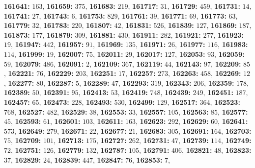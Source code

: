 \textsf{\bfseries 161641:} $163$, \textsf{\bfseries 161659:} $375$, \textsf{\bfseries 161683:} $219$, \textsf{\bfseries 161717:} $31$, \textsf{\bfseries 161729:} $459$, \textsf{\bfseries 161731:} $14$, \textsf{\bfseries 161741:} $27$, \textsf{\bfseries 161743:} $6$, \textsf{\bfseries 161753:} $829$, \textsf{\bfseries 161761:} $39$, \textsf{\bfseries 161771:} $69$, \textsf{\bfseries 161773:} $63$, \textsf{\bfseries 161779:} $32$, \textsf{\bfseries 161783:} $220$, \textsf{\bfseries 161807:} $42$, \textsf{\bfseries 161831:} $526$, \textsf{\bfseries 161839:} $127$, \textsf{\bfseries 161869:} $187$, \textsf{\bfseries 161873:} $177$, \textsf{\bfseries 161879:} $309$, \textsf{\bfseries 161881:} $430$, \textsf{\bfseries 161911:} $282$, \textsf{\bfseries 161921:} $277$, \textsf{\bfseries 161923:} $19$, \textsf{\bfseries 161947:} $442$, \textsf{\bfseries 161957:} $91$, \textsf{\bfseries 161969:} $135$, \textsf{\bfseries 161971:} $26$, \textsf{\bfseries 161977:} $116$, \textsf{\bfseries 161983:} $114$, \textsf{\bfseries 161999:} $19$, \textsf{\bfseries 162007:} $75$, \textsf{\bfseries 162011:} $29$, \textsf{\bfseries 162017:} $127$, \textsf{\bfseries 162053:} $93$, \textsf{\bfseries 162059:} $59$, \textsf{\bfseries 162079:} $486$, \textsf{\bfseries 162091:} $2$, \textsf{\bfseries 162109:} $367$, \textsf{\bfseries 162119:} $44$, \textsf{\bfseries 162143:} $97$, \textsf{\bfseries 162209:} $85$, \textsf{\bfseries 162221:} $76$, \textsf{\bfseries 162229:} $203$, \textsf{\bfseries 162251:} $17$, \textsf{\bfseries 162257:} $273$, \textsf{\bfseries 162263:} $458$, \textsf{\bfseries 162269:} $12$, \textsf{\bfseries 162277:} $80$, \textsf{\bfseries 162287:} $5$, \textsf{\bfseries 162289:} $47$, \textsf{\bfseries 162293:} $319$, \textsf{\bfseries 162343:} $206$, \textsf{\bfseries 162359:} $178$, \textsf{\bfseries 162389:} $50$, \textsf{\bfseries 162391:} $95$, \textsf{\bfseries 162413:} $53$, \textsf{\bfseries 162419:} $748$, \textsf{\bfseries 162439:} $249$, \textsf{\bfseries 162451:} $187$, \textsf{\bfseries 162457:} $65$, \textsf{\bfseries 162473:} $228$, \textsf{\bfseries 162493:} $530$, \textsf{\bfseries 162499:} $129$, \textsf{\bfseries 162517:} $364$, \textsf{\bfseries 162523:} $768$, \textsf{\bfseries 162527:} $482$, \textsf{\bfseries 162529:} $38$, \textsf{\bfseries 162553:} $33$, \textsf{\bfseries 162557:} $105$, \textsf{\bfseries 162563:} $85$, \textsf{\bfseries 162577:} $45$, \textsf{\bfseries 162593:} $61$, \textsf{\bfseries 162601:} $103$, \textsf{\bfseries 162611:} $163$, \textsf{\bfseries 162623:} $292$, \textsf{\bfseries 162629:} $60$, \textsf{\bfseries 162641:} $573$, \textsf{\bfseries 162649:} $279$, \textsf{\bfseries 162671:} $22$, \textsf{\bfseries 162677:} $21$, \textsf{\bfseries 162683:} $305$, \textsf{\bfseries 162691:} $164$, \textsf{\bfseries 162703:} $75$, \textsf{\bfseries 162709:} $101$, \textsf{\bfseries 162713:} $175$, \textsf{\bfseries 162727:} $262$, \textsf{\bfseries 162731:} $47$, \textsf{\bfseries 162739:} $114$, \textsf{\bfseries 162749:} $72$, \textsf{\bfseries 162751:} $126$, \textsf{\bfseries 162779:} $132$, \textsf{\bfseries 162787:} $105$, \textsf{\bfseries 162791:} $406$, \textsf{\bfseries 162821:} $48$, \textsf{\bfseries 162823:} $37$, \textsf{\bfseries 162829:} $24$, \textsf{\bfseries 162839:} $447$, \textsf{\bfseries 162847:} $76$, \textsf{\bfseries 162853:} $7$, 
